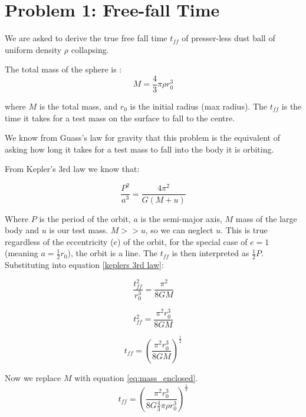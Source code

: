 

\section*{Problem 1: Free-fall Time}


We are asked to derive the true free fall time $t_{ff}$ of presser-less dust ball of uniform density $\rho$ collapsing.

The total mass of the sphere is :
\begin{equation} \label{eq:mass_enclosed}
    M = \frac{4}{3}\pi \rho r_0^3
\end{equation}

where $M$ is the total mass, and $r_0$ is the initial radius (max radius). The  $t_{ff}$ is the time it takes for a test mass on the surface to fall to the centre. 

We know from Guass's law for gravity that this problem is the equivalent of asking how long it takes for a test mass to fall into the body it is orbiting. 

From Kepler's 3rd law we know that:

\begin{equation} \label{keplers 3rd law}
    \frac{P^2}{a^3} = \frac{4\pi^2}{G(M + u)}
\end{equation}

Where $P$ is the period of the orbit, $a$ is the semi-major axis, $M$ mass of the large body and $u$ is our test mass. $M >> u$, so we can neglect $u$. This is true regardless of the eccentricity ($e$) of the orbit, for the special case of $e=1$ (meaning $a = \frac{1}{2}r_0$), the orbit is a line. The $t_{ff}$ is then interpreted as $\frac{1}{2}P$. Substituting into equation  \ref{keplers 3rd law}:

\begin{equation} 
    \frac{t_{ff}^2}{r_0^3} = \frac{\pi^2}{8GM}
\end{equation}

\begin{equation} 
    t_{ff}^2 = \frac{\pi^2r_0^3}{8GM}
\end{equation}


\begin{equation} 
    t_{ff} = (\frac{\pi^2r_0^3}{8GM})^{\frac{1}{2}}
\end{equation}

Now we replace $M$ with equation \ref{eq:mass_enclosed}. 
\begin{equation} 
    t_{ff} = (\frac{\pi^2r_0^3}{8G\frac{4}{3}\pi \rho r_0^3})^{\frac{1}{2}}
\end{equation}

